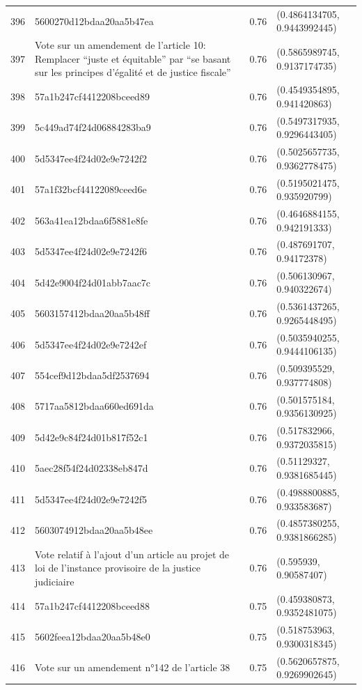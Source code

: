 \begin{table}[ht]
\begin{tabular}{rlrl}
  396 & 5600270d12bdaa20aa5b47ea & 0.76 & (0.4864134705, 0.9443992445) \\ 
  397 & Vote sur un amendement de l'article 10: Remplacer “juste et équitable” par “se basant sur les principes d’égalité et de justice fiscale” & 0.76 & (0.5865989745, 0.9137174735) \\ 
  398 & 57a1b247cf4412208bceed89 & 0.76 & (0.4549354895, 0.941420863) \\ 
  399 & 5c449ad74f24d06884283ba9 & 0.76 & (0.5497317935, 0.9296443405) \\ 
  400 & 5d5347ee4f24d02e9e7242f2 & 0.76 & (0.5025657735, 0.9362778475) \\ 
  401 & 57a1f32bcf44122089ceed6e & 0.76 & (0.5195021475, 0.935920799) \\ 
  402 & 563a41ea12bdaa6f5881e8fe & 0.76 & (0.4646884155, 0.942191333) \\ 
  403 & 5d5347ee4f24d02e9e7242f6 & 0.76 & (0.487691707, 0.94172378) \\ 
  404 & 5d42e9004f24d01abb7aac7c & 0.76 & (0.506130967, 0.940322674) \\ 
  405 & 5603157412bdaa20aa5b48ff & 0.76 & (0.5361437265, 0.9265448495) \\ 
  406 & 5d5347ee4f24d02e9e7242ef & 0.76 & (0.5035940255, 0.9444106135) \\ 
  407 & 554cef9d12bdaa5df2537694 & 0.76 & (0.509395529, 0.937774808) \\ 
  408 & 5717aa5812bdaa660ed691da & 0.76 & (0.501575184, 0.9356130925) \\ 
  409 & 5d42e9c84f24d01b817f52c1 & 0.76 & (0.517832966, 0.9372035815) \\ 
  410 & 5aec28f54f24d02338eb847d & 0.76 & (0.51129327, 0.9381685445) \\ 
  411 & 5d5347ee4f24d02e9e7242f5 & 0.76 & (0.4988800885, 0.933583687) \\ 
  412 & 5603074912bdaa20aa5b48ee & 0.76 & (0.4857380255, 0.9381866285) \\ 
  413 & Vote relatif à l'ajout d'un article au projet de loi de l'instance provisoire de la justice judiciaire & 0.76 & (0.595939, 0.90587407) \\ 
  414 & 57a1b247cf4412208bceed88 & 0.75 & (0.459380873, 0.9352481075) \\ 
  415 & 5602feea12bdaa20aa5b48e0 & 0.75 & (0.518753963, 0.9300318345) \\ 
  416 & Vote sur un amendement n°142 de l'article 38 & 0.75 & (0.5620657875, 0.9269902645) \\ 

\end{tabular}
\end{table}

